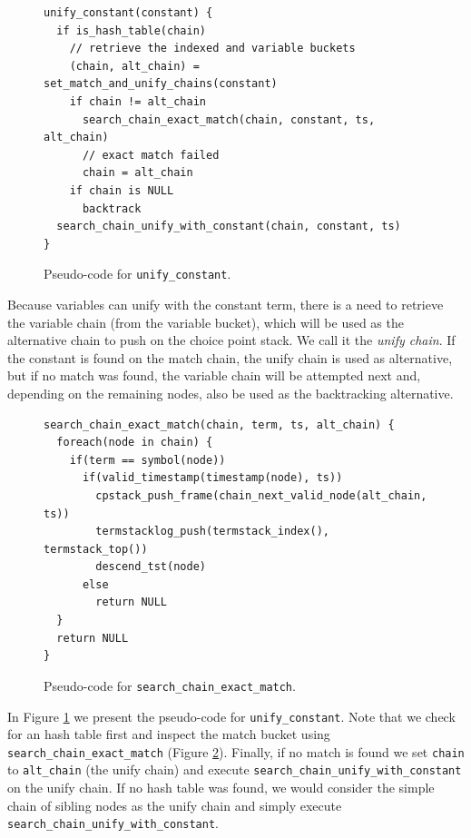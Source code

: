 \begin{figure}[ht]
\begin{Verbatim}
unify_constant(constant) {
  if is_hash_table(chain)
    // retrieve the indexed and variable buckets
    (chain, alt_chain) = set_match_and_unify_chains(constant)
    if chain != alt_chain
      search_chain_exact_match(chain, constant, ts, alt_chain)
      // exact match failed
      chain = alt_chain
    if chain is NULL
      backtrack
  search_chain_unify_with_constant(chain, constant, ts)
}
\end{Verbatim}
\caption{Pseudo-code for \texttt{unify\_constant}.}
\label{fig:unify_constant}
\end{figure}

Because variables can unify with the constant term, there is a need to retrieve the variable chain (from the variable bucket), which will be used as the alternative chain to push on the choice point stack. We call it the \textit{unify chain}. If the constant is found on the match chain, the unify chain is used as alternative, but if no match was found, the variable chain will be attempted next and, depending on the remaining nodes, also be used as the backtracking alternative.

\begin{figure}[ht]
\begin{Verbatim}
search_chain_exact_match(chain, term, ts, alt_chain) {
  foreach(node in chain) {
    if(term == symbol(node))
      if(valid_timestamp(timestamp(node), ts))
        cpstack_push_frame(chain_next_valid_node(alt_chain, ts))
        termstacklog_push(termstack_index(), termstack_top())
        descend_tst(node)
      else
        return NULL
  }
  return NULL
}
\end{Verbatim}
\caption{Pseudo-code for \texttt{search\_chain\_exact\_match}.}
\label{fig:search_chain_exact_match}
\end{figure}

In Figure \ref{fig:unify_constant} we present the pseudo-code for \texttt{unify\_constant}. Note that we check for an hash table first and inspect the match bucket using \texttt{search\_chain\_exact\_match} (Figure \ref{fig:search_chain_exact_match}).
Finally, if no match is found we set \texttt{chain} to \texttt{alt\_chain} (the unify chain) and execute \texttt{search\_chain\_unify\_with\_constant} on the unify chain. If no hash table was found, we would consider the simple chain of sibling nodes as the unify chain and simply execute \texttt{search\_chain\_unify\_with\_constant}.

